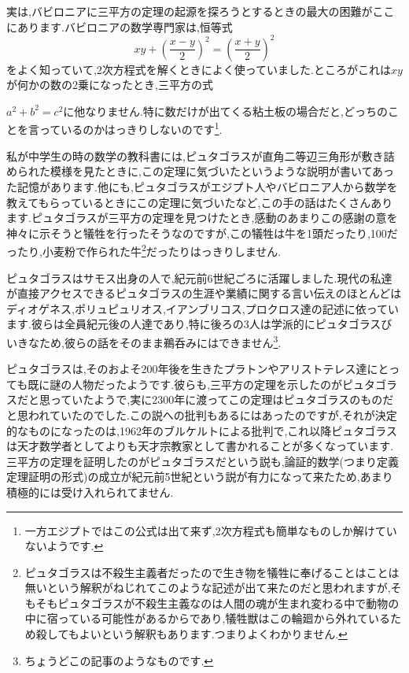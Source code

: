 \documentclass[./main]{subfiles}
\begin{document}
実は,バビロニアに三平方の定理の起源を探ろうとするときの最大の困難がここにあります.バビロニアの数学専門家は,恒等式
\begin{equation}
	xy + \left( \frac{x-y}{2} \right)^2 = \left( \frac{x+y}{2} \right)^2
\end{equation}
をよく知っていて,2次方程式を解くときによく使っていました.ところがこれは$xy$が何かの数の2乗になったとき,三平方の式{$a^2 + b^2 = c^2$に他なりません.特に数だけが出てくる粘土板の場合だと,どっちのことを言っているのかはっきりしないのです\footnote{一方エジプトではこの公式は出て来ず,2次方程式も簡単なものしか解けていないようです.}.


私が中学生の時の数学の教科書には,ピュタゴラスが直角二等辺三角形が敷き詰められた模様を見たときに,この定理に気づいたというような説明が書いてあった記憶があります.他にも,ピュタゴラスがエジプト人やバビロニア人から数学を教えてもらっているときにこの定理に気づいたなど,この手の話はたくさんあります.ピュタゴラスが三平方の定理を見つけたとき,感動のあまりこの感謝の意を神々に示そうと犠牲を行ったそうなのですが,この犠牲は牛を1頭だったり,100だったり,小麦粉で作られた牛\footnote{\cite{Por} ピュタゴラスは不殺生主義者だったので生き物を犠牲に奉げることはことは無いという解釈がねじれてこのような記述が出て来たのだと思われますが,そもそもピュタゴラスが不殺生主義なのは人間の魂が生まれ変わる中で動物の中に宿っている可能性があるからであり,犠牲獣はこの輪廻から外れているため殺してもよいという解釈もあります.つまりよくわかりません.}だったりはっきりしません.

ピュタゴラスはサモス出身の人で,紀元前6世紀ごろに活躍しました.現代の私達が直接アクセスできるピュタゴラスの生涯や業績に関する言い伝えのほとんどはディオゲネス,ポリュピュリオス,イアンブリコス,プロクロス達の記述に依っています.彼らは全員紀元後の人達であり,特に後ろの3人は学派的にピュタゴラスびいきなため,彼らの話をそのまま鵜呑みにはできません\footnote{ちょうどこの記事のようなものです.}.

ピュタゴラスは,そのおよそ200年後を生きたプラトンやアリストテレス達にとっても既に謎の人物だったようです.彼らも,三平方の定理を示したのがピュタゴラスだと思っていたようで,実に2300年に渡ってこの定理はピュタゴラスのものだと思われていたのでした.この説への批判もあるにはあったのですが,それが決定的なものになったのは,1962年のブルケルトによる批判で,これ以降ピュタゴラスは天才数学者としてよりも天才宗教家として書かれることが多くなっています.三平方の定理を証明したのがピュタゴラスだという説も,論証的数学(つまり定義定理証明の形式)の成立が紀元前5世紀という説が有力になって来たため,あまり積極的には受け入れられてません.

}
\end{document}

